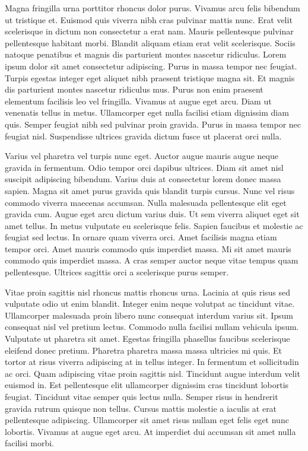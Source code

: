 \documentclass[11pt,a4paper]{article}
\begin{document}
Magna fringilla urna porttitor rhoncus dolor purus. Vivamus arcu felis bibendum ut tristique et. Euismod quis viverra nibh cras pulvinar mattis nunc. Erat velit scelerisque in dictum non consectetur a erat nam. Mauris pellentesque pulvinar pellentesque habitant morbi. Blandit aliquam etiam erat velit scelerisque. Sociis natoque penatibus et magnis dis parturient montes nascetur ridiculus. Lorem ipsum dolor sit amet consectetur adipiscing. Purus in massa tempor nec feugiat. Turpis egestas integer eget aliquet nibh praesent tristique magna sit. Et magnis dis parturient montes nascetur ridiculus mus. Purus non enim praesent elementum facilisis leo vel fringilla. Vivamus at augue eget arcu. Diam ut venenatis tellus in metus. Ullamcorper eget nulla facilisi etiam dignissim diam quis. Semper feugiat nibh sed pulvinar proin gravida. Purus in massa tempor nec feugiat nisl. Suspendisse ultrices gravida dictum fusce ut placerat orci nulla.

Varius vel pharetra vel turpis nunc eget. Auctor augue mauris augue neque gravida in fermentum. Odio tempor orci dapibus ultrices. Diam sit amet nisl suscipit adipiscing bibendum. Varius duis at consectetur lorem donec massa sapien. Magna sit amet purus gravida quis blandit turpis cursus. Nunc vel risus commodo viverra maecenas accumsan. Nulla malesuada pellentesque elit eget gravida cum. Augue eget arcu dictum varius duis. Ut sem viverra aliquet eget sit amet tellus. In metus vulputate eu scelerisque felis. Sapien faucibus et molestie ac feugiat sed lectus. In ornare quam viverra orci. Amet facilisis magna etiam tempor orci. Amet mauris commodo quis imperdiet massa. Mi sit amet mauris commodo quis imperdiet massa. A cras semper auctor neque vitae tempus quam pellentesque. Ultrices sagittis orci a scelerisque purus semper.

Vitae proin sagittis nisl rhoncus mattis rhoncus urna. Lacinia at quis risus sed vulputate odio ut enim blandit. Integer enim neque volutpat ac tincidunt vitae. Ullamcorper malesuada proin libero nunc consequat interdum varius sit. Ipsum consequat nisl vel pretium lectus. Commodo nulla facilisi nullam vehicula ipsum. Vulputate ut pharetra sit amet. Egestas fringilla phasellus faucibus scelerisque eleifend donec pretium. Pharetra pharetra massa massa ultricies mi quis. Et tortor at risus viverra adipiscing at in tellus integer. In fermentum et sollicitudin ac orci. Quam adipiscing vitae proin sagittis nisl. Tincidunt augue interdum velit euismod in. Est pellentesque elit ullamcorper dignissim cras tincidunt lobortis feugiat. Tincidunt vitae semper quis lectus nulla. Semper risus in hendrerit gravida rutrum quisque non tellus. Cursus mattis molestie a iaculis at erat pellentesque adipiscing. Ullamcorper sit amet risus nullam eget felis eget nunc lobortis. Vivamus at augue eget arcu. At imperdiet dui accumsan sit amet nulla facilisi morbi.
\end{document}

